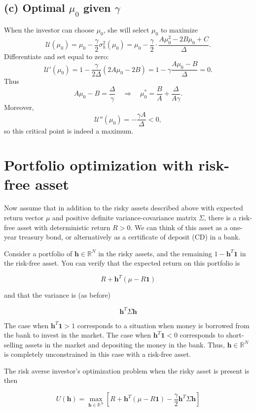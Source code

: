 \documentclass{article}
\begin{document}
\subsection*{(c) Optimal $\mu_0$ given $\gamma$}

When the investor can choose $\mu_0$, she will select $\mu_0$ to maximize
\[
\mathcal U(\mu_0)=\mu_0-\frac{\gamma}{2}\sigma_h^2(\mu_0)
=\mu_0-\frac{\gamma}{2}\cdot\frac{A\mu_0^2-2B\mu_0+C}{\Delta}.
\]
Differentiate and set equal to zero:
\[
\mathcal U'(\mu_0)
=1-\frac{\gamma}{2\Delta}(2A\mu_0-2B)
=1-\gamma\frac{A\mu_0-B}{\Delta}=0.
\]
Thus
\[
A\mu_0-B=\frac{\Delta}{\gamma}
\quad\Longrightarrow\quad
\boxed{\mu_0^{\ast}=\frac{B}{A}+\frac{\Delta}{A\gamma}}.
\]
Moreover,
\[
\mathcal U''(\mu_0)=-\frac{\gamma A}{\Delta}<0,
\]
so this critical point is indeed a maximum.

\newpage
\section{Portfolio optimization with risk-free asset}

Now assume that in addition to the risky assets described above with expected return vector $\mu$ and positive definite variance-covariance matrix $\Sigma$, there is a risk-free asset with deterministic return $R > 0$. We can think of this asset as a one-year treasury bond, or alternatively as a certificate of deposit (CD) in a bank.

Consider a portfolio of $\mathbf{h} \in \mathbb{R}^N$ in the risky assets, and the remaining $1 - \mathbf{h}^T \mathbf{1}$ in the risk-free asset. You can verify that the expected return on this portfolio is

\[
R + \mathbf{h}^T (\mu - R \mathbf{1})
\]

and that the variance is (as before)

\[
\mathbf{h}^T \Sigma \mathbf{h}
\]

The case when $\mathbf{h}^T \mathbf{1} > 1$ corresponds to a situation when money is borrowed from the bank to invest in the market. The case when $\mathbf{h}^T \mathbf{1} < 0$ corresponds to short-selling assets in the market and depositing the money in the bank. Thus, $\mathbf{h} \in \mathbb{R}^N$ is completely unconstrained in this case with a risk-free asset.

The risk averse investor's optimization problem when the risky asset is present is then

\[
U(\mathbf{h}) = \max_{\mathbf{h} \in \mathbb{R}^N} \left[ R + \mathbf{h}^T (\mu - R \mathbf{1}) - \frac{\gamma}{2} \mathbf{h}^T \Sigma \mathbf{h} \right]
\]
\end{document}
